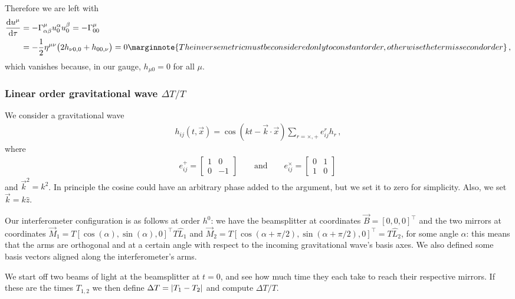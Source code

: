 \documentclass[main.tex]{subfiles}
\begin{document}
Therefore we are left with 
%
\begin{align}
\dv{ u^{\mu }}{\tau } &= - \Gamma^{\mu }_{\alpha \beta } u^{\alpha }_{0} u^{\beta }_{0} = - \Gamma^{\mu }_{00} \\
&= - \frac{1}{2} \eta^{\mu \nu } \qty(2h_{\nu  0, 0} + h_{00,\nu }) = 0 \marginnote{The inverse metric must be considered only to constant order, otherwise the term is second order}
\,,
\end{align}
%
which vanishes because, in our gauge, \(h_{\mu 0} = 0\) for all \(\mu \). 

\subsubsection{Linear order gravitational wave \(\Delta T / T\)}

We consider a gravitational wave 
%
\begin{align}
h_{ij} (t, \vec{x}) = \cos(kt - \vec{k} \cdot \vec{x}) \sum _{r = \times , +} e_{ij}^{r} h_{r}
\,,
\end{align}
%
where 
%
\begin{align}
e_{ij}^{+} = \left[\begin{array}{cc}
1 &  0 \\ 
0 & -1
\end{array}\right] \qquad \text{and} \qquad
e_{ij}^{ \times } = \left[\begin{array}{cc}
0 & 1 \\ 
1 & 0
\end{array}\right]
\,
\end{align}
%
and \(\vec{k}^2 = k^2\). In principle the cosine could have an arbitrary phase added to the argument, but we set it to zero for simplicity. 
Also, we set \(\vec{k} = k \hat{z}\). 

Our interferometer configuration is as follows at order \(h^{0}\): we have the beamsplitter at coordinates \(\vec{B} = [0,0,0]^{\top}\) and the two mirrors at coordinates \(\vec{M}_{1} = T [\cos(\alpha ), \sin(\alpha ),0]^{\top} T \hat{L}_{1}\) and \(\vec{M}_{2} = T [ \cos(\alpha + \pi /2), \sin(\alpha + \pi /2),0]^{\top} = T \hat{L}_{2}\), for some angle \(\alpha \): this means that the arms are orthogonal and at a certain angle with respect to the incoming gravitational wave's basis axes. 
We also defined some basis vectors aligned along the interferometer's arms. 

We start off two beams of light at the beamsplitter at \(t=0\), and see how much time they each take to reach their respective mirrors. If these are the times \(T_{1,2}\) we then define \(\Delta T = \abs{T_1 - T_2 }\) and compute \(\Delta T / T\). 
\end{document}
